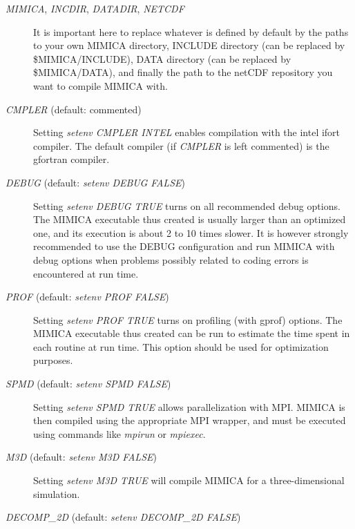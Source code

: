 \documentclass[12pt,A4,french]{article}
\begin{document}
\begin{description}

\item[{\it MIMICA}, {\it INCDIR}, {\it DATADIR}, {\it NETCDF}]

It is important here to replace whatever is defined by default by the paths to your own MIMICA directory, INCLUDE directory (can be replaced by \$MIMICA/INCLUDE), DATA directory (can be replaced by \$MIMICA/DATA), and finally the path to the netCDF repository you want to compile MIMICA with. 

\item[{\it CMPLER} (default: commented)]

Setting {\it setenv CMPLER INTEL} enables compilation with the intel ifort compiler. The default compiler (if {\it CMPLER} is left commented) is the gfortran compiler.

\item[{\it DEBUG} (default: {\it setenv DEBUG FALSE})]

Setting {\it setenv DEBUG TRUE} turns on all recommended debug options. The MIMICA executable thus created is usually larger than an optimized one, and its execution is about 2 to 10 times slower. It is however strongly recommended to use the DEBUG configuration and run MIMICA with debug options when problems possibly related to coding errors is encountered at run time.

\item[{\it PROF} (default: {\it setenv PROF FALSE})]

Setting {\it setenv PROF TRUE} turns on profiling (with gprof) options. The MIMICA executable thus created can be run to estimate the time spent in each routine at run time. This option should be used for optimization purposes.

\item[{\it SPMD} (default: {\it setenv SPMD FALSE})]

Setting {\it setenv SPMD TRUE} allows parallelization with MPI. MIMICA is then compiled using the appropriate MPI wrapper, and must be executed using commands like {\it mpirun} or {\it mpiexec}.

\item[{\it M3D} (default: {\it setenv M3D FALSE})]

Setting {\it setenv M3D TRUE} will compile MIMICA for a three-dimensional simulation.

\item[{\it DECOMP\_2D} (default: {\it setenv DECOMP\_2D FALSE})]


\end{description}
\end{document}
